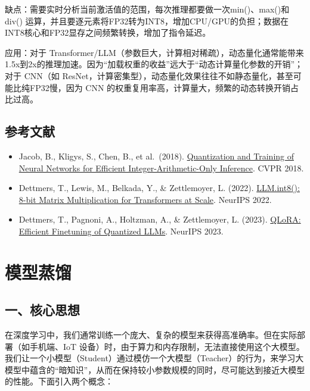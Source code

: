 缺点：需要实时分析当前激活值的范围，每次推理都要做一次min()、max()和div() 运算，并且要逐元素将FP32转为INT8，增加CPU/GPU的负担；数据在INT8核心和FP32显存之间频繁转换，增加了指令延迟。

应用：对于 Transformer/LLM（参数巨大，计算相对稀疏），动态量化通常能带来1.5x到2x的推理加速。因为``加载权重的收益''远大于``动态计算量化参数的开销''；对于 CNN（如 ResNet，计算密集型），动态量化效果往往不如静态量化，甚至可能比纯FP32慢，因为 CNN 的权重复用率高，计算量大，频繁的动态转换开销占比过高。

\hypertarget{ux53c2ux8003ux6587ux732e-86}{%
\subsection{参考文献}\label{ux53c2ux8003ux6587ux732e-86}}

\begin{itemize}
\tightlist
\item
  Jacob, B., Kligys, S., Chen, B., et al.~(2018). \href{https://arxiv.org/abs/1712.05877}{Quantization and Training of Neural Networks for Efficient Integer-Arithmetic-Only Inference}. CVPR 2018.
\item
  Dettmers, T., Lewis, M., Belkada, Y., \& Zettlemoyer, L. (2022). \href{https://arxiv.org/abs/2208.07339}{LLM.int8(): 8-bit Matrix Multiplication for Transformers at Scale}. NeurIPS 2022.
\item
  Dettmers, T., Pagnoni, A., Holtzman, A., \& Zettlemoyer, L. (2023). \href{https://arxiv.org/abs/2305.14314}{QLoRA: Efficient Finetuning of Quantized LLMs}. NeurIPS 2023.
\end{itemize}

\clearpage

\hypertarget{ux6a21ux578bux84b8ux998f}{%
\section{模型蒸馏}\label{ux6a21ux578bux84b8ux998f}}

\hypertarget{ux4e00ux6838ux5fc3ux601dux60f3-7}{%
\subsection{一、核心思想}\label{ux4e00ux6838ux5fc3ux601dux60f3-7}}

在深度学习中，我们通常训练一个庞大、复杂的模型来获得高准确率。但在实际部署（如手机端、IoT 设备）时，由于算力和内存限制，无法直接使用这个大模型。我们让一个小模型（Student）通过模仿一个大模型（Teacher）的行为，来学习大模型中蕴含的``暗知识''，从而在保持较小参数规模的同时，尽可能达到接近大模型的性能。下面引入两个概念：

